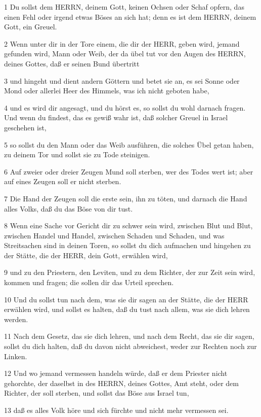\par 1 Du sollst dem HERRN, deinem Gott, keinen Ochsen oder Schaf opfern, das einen Fehl oder irgend etwas Böses an sich hat; denn es ist dem HERRN, deinem Gott, ein Greuel.
\par 2 Wenn unter dir in der Tore einem, die dir der HERR, geben wird, jemand gefunden wird, Mann oder Weib, der da übel tut vor den Augen des HERRN, deines Gottes, daß er seinen Bund übertritt
\par 3 und hingeht und dient andern Göttern und betet sie an, es sei Sonne oder Mond oder allerlei Heer des Himmels, was ich nicht geboten habe,
\par 4 und es wird dir angesagt, und du hörst es, so sollst du wohl darnach fragen. Und wenn du findest, das es gewiß wahr ist, daß solcher Greuel in Israel geschehen ist,
\par 5 so sollst du den Mann oder das Weib ausführen, die solches Übel getan haben, zu deinem Tor und sollst sie zu Tode steinigen.
\par 6 Auf zweier oder dreier Zeugen Mund soll sterben, wer des Todes wert ist; aber auf eines Zeugen soll er nicht sterben.
\par 7 Die Hand der Zeugen soll die erste sein, ihn zu töten, und darnach die Hand alles Volks, daß du das Böse von dir tust.
\par 8 Wenn eine Sache vor Gericht dir zu schwer sein wird, zwischen Blut und Blut, zwischen Handel und Handel, zwischen Schaden und Schaden, und was Streitsachen sind in deinen Toren, so sollst du dich aufmachen und hingehen zu der Stätte, die der HERR, dein Gott, erwählen wird,
\par 9 und zu den Priestern, den Leviten, und zu dem Richter, der zur Zeit sein wird, kommen und fragen; die sollen dir das Urteil sprechen.
\par 10 Und du sollst tun nach dem, was sie dir sagen an der Stätte, die der HERR erwählen wird, und sollst es halten, daß du tust nach allem, was sie dich lehren werden.
\par 11 Nach dem Gesetz, das sie dich lehren, und nach dem Recht, das sie dir sagen, sollst du dich halten, daß du davon nicht abweichest, weder zur Rechten noch zur Linken.
\par 12 Und wo jemand vermessen handeln würde, daß er dem Priester nicht gehorchte, der daselbst in des HERRN, deines Gottes, Amt steht, oder dem Richter, der soll sterben, und sollst das Böse aus Israel tun,
\par 13 daß es alles Volk höre und sich fürchte und nicht mehr vermessen sei.
